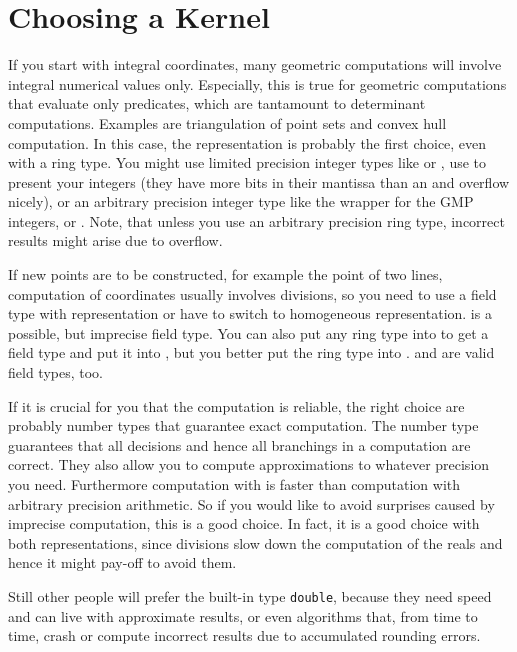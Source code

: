 \section{Choosing a Kernel}
If you start with integral  coordinates, many geometric computations
will involve integral numerical values only. Especially, this is true for
geometric computations that evaluate only predicates, which are tantamount to
determinant computations. Examples are triangulation of point sets and 
convex hull computation.
In this case, the  representation is probably the first choice, even
with a ring type. You might use limited precision integer types like
 or , use  to present your integers (they
have more bits in their mantissa than an  and overflow nicely), or an 
arbitrary precision integer type like the wrapper  for the
GMP integers,  or . Note, that unless you use
an arbitrary precision ring type, incorrect results might arise due to
overflow. 

If new points are to be constructed, for example
the  point of two lines, computation of 
 coordinates usually involves divisions, so
you need to use a field type with  representation
or have to switch to homogeneous representation. 
 is a possible, but imprecise field type.
You can also put any ring type into  to get a
field type and put it into , but you better put
the ring type into .
 and  are valid field types, too.

If it is crucial for you that the computation is reliable, 
the right choice are probably number types that guarantee
exact computation. The number type  guarantees
that all decisions and hence all branchings in a computation
are correct. They also allow you to compute approximations to whatever
precision you need. Furthermore computation with 
 is faster than computation with arbitrary precision
arithmetic. So if you would like to avoid surprises caused by imprecise
computation, this is a good choice. In fact, it is a good choice with
both representations, since divisions slow down the computation of
the reals and hence it might pay-off to avoid them.

Still other people will prefer the built-in
type {\tt double}, because they need speed and can live with
approximate results, or even algorithms that, from time to time,
crash or compute incorrect results due to accumulated rounding errors.
